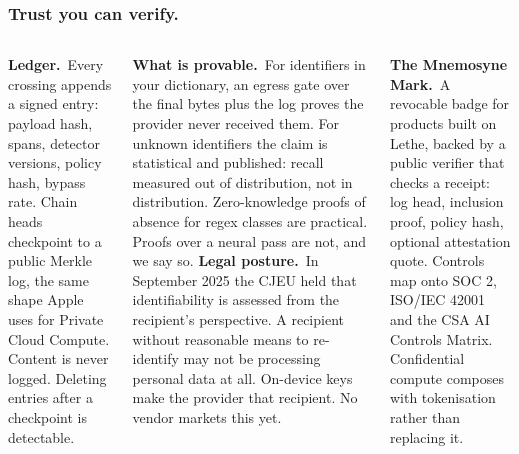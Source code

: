 \documentclass[aspectratio=169,10pt]{beamer}
\newcommand{\slideeyebrow}{}
\newcommand{\slide}[2]{\renewcommand{\slideeyebrow}{#1}\frametitle{#2}}
\newcommand{\para}[1]{\vspace{2pt}\textbf{#1}\ }
\begin{document}
\begin{frame}[shrink=20]
\slide{09}{Trust you can verify.}
\begin{columns}[T]
\para{Ledger.}Every crossing appends a signed entry: payload hash, spans, detector versions, policy hash, bypass rate. Chain heads checkpoint to a public Merkle log, the same shape Apple uses for Private Cloud Compute. Content is never logged. Deleting entries after a checkpoint is detectable.

\para{What is provable.}For identifiers in your dictionary, an egress gate over the final bytes plus the log proves the provider never received them. For unknown identifiers the claim is statistical and published: recall measured out of distribution, not in distribution. Zero-knowledge proofs of absence for regex classes are practical. Proofs over a neural pass are not, and we say so.
\para{Legal posture.}In September 2025 the CJEU held that identifiability is assessed from the recipient's perspective. A recipient without reasonable means to re-identify may not be processing personal data at all. On-device keys make the provider that recipient. No vendor markets this yet.

\para{The Mnemosyne Mark.}A revocable badge for products built on Lethe, backed by a public verifier that checks a receipt: log head, inclusion proof, policy hash, optional attestation quote. Controls map onto SOC 2, ISO/IEC 42001 and the CSA AI Controls Matrix. Confidential compute composes with tokenisation rather than replacing it.
\end{columns}
\end{frame}
\end{document}
